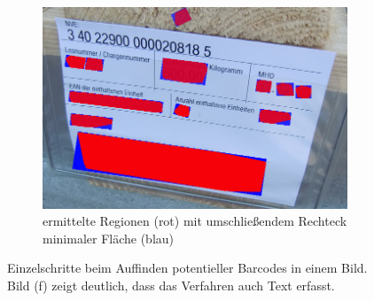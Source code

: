 \begin{figure}[H]
\begin{subfigure}[t]{.32\columnwidth}
    \includegraphics[width=\columnwidth]{img/techniques/candidate-extraction/candidates}
    \caption{\scriptsize ermittelte Regionen (rot) mit umschließendem Rechteck minimaler Fläche (blau)}
  \end{subfigure}
  \caption[Einzelschritte beim Auffinden potentieller Barcodes]{
    Einzelschritte beim Auffinden potentieller Barcodes in einem Bild\protect\footnotemark.
    Bild (f) zeigt deutlich, dass das Verfahren auch Text erfasst.}
\end{figure}


